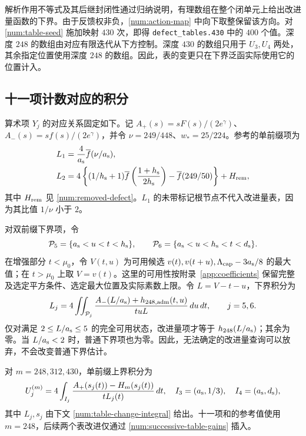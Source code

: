 解析作用不等式及其后继封闭性通过归纳说明，有理数组在整个闭单元上给出改进量函数的下界。由于反馈权非负，\eqref{num:action-map} 中向下取整保留该方向。对 \eqref{num:table-seed} 施加映射 $430$ 次，即得 \texttt{defect\_tables.430} 中的 $400$ 个值。深度 $248$ 的数组由对应有限迭代从下方控制。深度 $430$ 的数组只用于 $U_3,U_4$ 两处，其余指定位置使用深度 $248$ 的数组。因此，表的变更只在下界泛函实际使用它的位置计入。

\subsection{十一项计数对应的积分}
\label{num:eleven-integrals}
算术项 $Y_j$ 的对应关系固定如下。记 $A_+(s)=sF(s)/(2e^\gamma)$、$A_-(s)=sf(s)/(2e^\gamma)$，并令 $\nu=249/448$、$w_*=25/224$。参考的单前缀项为
\begin{align*}
 L_1&=\frac4{a_{\rm s}}\overline f(\nu/{a_{\rm s}}),\\
 L_2&=4\left\{(1/{h_{\rm s}}+1)\overline f\left(\frac{1+{h_{\rm s}}}{2{h_{\rm s}}}\right)
                 -\overline f(249/50)\right\}+H_{\rm rem},
\end{align*}
其中 $H_{\rm rem}$ 见 \eqref{num:removed-defect}。$L_1$ 的未带标记根节点不代入改进量表，因为其比值 $1/\nu$ 小于 $2$。

对双前缀下界项，令
\[
 \mathcal P_5=\{{a_{\rm s}}<u<t<{h_{\rm s}}\},\qquad
 \mathcal P_6=\{{a_{\rm s}}<u<{h_{\rm s}}<t<{d_{\rm s}}\}.
\]
在增强部分 $t<\mu_0$，令 $V(t,u)$ 为可用候选 $v(t),v(t+u),\Lambda_{\rm cap}-3{a_{\rm s}}/8$ 的最大值；在 $t>\mu_0$ 上取 $V=v(t)$。这里的可用性按附录~\ref{app:coefficients} 保留完整及选定平方条件、选定最大位置及实际素数上限。令 $L=V-t-u$，下界积分为
\begin{equation}
 L_j=4\iint_{\mathcal P_j}
        \frac{A_-(L/{a_{\rm s}})+h_{248,\rm adm}(t,u)}{tuL}\,du\,dt,
 \qquad j=5,6.
 \label{num:pair-lower-integrals}
\end{equation}
仅对满足 $2\le L/{a_{\rm s}}\le5$ 的完全可用状态，改进量项才等于 $h_{248}(L/{a_{\rm s}})$；其余为零。当 $L/{a_{\rm s}}<2$ 时，普通下界项也为零。因此，无法确定的改进量查询可以放弃，不会改变普通下界估计。

对 $m=248,312,430$，单前缀上界积分为
\begin{equation}
 U_j^{(m)}=4\int_{I_j}
       \frac{A_+(s_j(t))-H_m(s_j(t))}{tL_j(t)}\,dt,
 \quad I_3=({a_{\rm s}},1/3),\quad I_4=({a_{\rm s}},{d_{\rm s}}),
 \label{num:one-prefix-upper-integrals}
\end{equation}
其中 $L_j,s_j$ 由下文 \eqref{num:table-change-integral} 给出。十一项和的参考值使用 $m=248$，后续两个表改进仅通过 \eqref{num:successive-table-gains} 插入。

